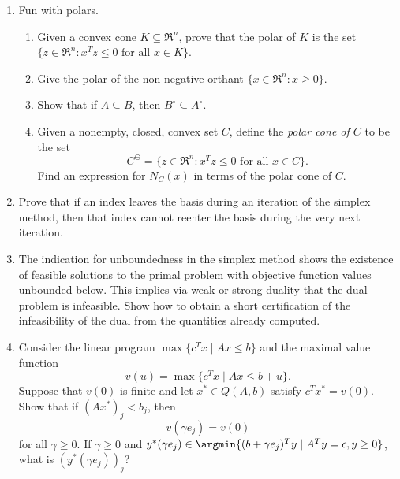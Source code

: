 \documentclass[11pt]{article}
\begin{document}

\begin{enumerate}

\item Fun with polars.
\begin{enumerate}
\item Given a convex cone $K \subseteq \Re^n$, prove that the polar of
$K$ is the set $\{z \in \Re^n: x^Tz \leq 0 \mbox{ for all } x \in
K\}$.
\item Give the polar of the non-negative orthant $\{x \in \Re^n: x
\geq 0\}$.
\item Show that if $A \subseteq B$, then $B^\circ \subseteq A^\circ$.
\item Given a nonempty, closed, convex set $C$, define the \textit{polar cone of $C$} to be the set
$$
C^\ominus = \{z \in \Re^n: x^Tz \leq 0 \mbox{ for all } x \in
C\}.
$$
Find an expression for $N_C(x)$ in terms of the polar cone of $C$.
\end{enumerate}


\item Prove that if an index leaves the basis during an iteration of the simplex method, then that index cannot reenter the basis during the very next iteration.

\item  The indication for unboundedness in the simplex method shows the existence of feasible solutions to the primal problem with objective function values unbounded below.  This implies via weak or strong duality that the dual problem is infeasible.  Show how to obtain a short certification of the infeasibility of the dual from the quantities already computed.

\item Consider the linear program $\max\{c^Tx \mid Ax \leq b\}$ and the maximal value function 
$$
v(u) = \max\{c^Tx \mid Ax \leq b + u\}.
$$
Suppose that $v(0)$ is finite and let $x^\ast \in Q(A, b)$ satisfy $c^T x^\ast = v(0)$. Show that if $(Ax^\ast)_j < b_j$, then 
$$
v(\gamma e_j) = v(0)
$$
for all $ \gamma \geq 0$. If $\gamma \geq 0$ and $y^\ast(\gamma e_j) \in \argmin\{ (b+\gamma e_j)^T y \mid A^Ty = c, y \geq 0\}$, what is $(y^\ast(\gamma e_j))_j$?

\end{enumerate}
\end{document}
